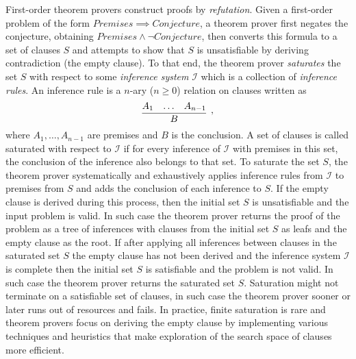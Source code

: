 First-order theorem provers construct proofs by \emph{refutation}. Given a first-order problem of the form $\mathit{Premises}\implies\mathit{Conjecture}$, a theorem prover first negates the conjecture, obtaining $\mathit{Premises}\wedge\neg\mathit{Conjecture}$, then converts this formula to a set of clauses $S$ and attempts to show that $S$ is unsatisfiable by deriving contradiction (the empty clause). To that end, the theorem prover \emph{saturates} the set $S$ with respect to some \emph{inference system} $\mathcal{I}$ which is a collection of \emph{inference rules}. An inference rule is a $n$-ary ($n\ge0$) relation on clauses written as \[\infer[,]{B}{A_1 & \ldots & A_{n-1}}\] where $A_1,\ldots,A_{n-1}$ are premises and $B$ is the conclusion. A set of clauses is called saturated with respect to $\mathcal{I}$ if for every inference of $\mathcal{I}$ with premises in this set, the conclusion of the inference also belongs to that set. To saturate the set $S$, the theorem prover systematically and exhaustively applies inference rules from $\mathcal{I}$ to premises from $S$ and adds the conclusion of each inference to $S$. If the empty clause is derived during this process, then the initial set $S$ is unsatisfiable and the input problem is valid. In such case the theorem prover returns the proof of the problem as a tree of inferences with clauses from the initial set $S$ as leafs and the empty clause as the root. If after applying all inferences between clauses in the saturated set $S$ the empty clause has not been derived and the inference system $\mathcal{I}$ is complete then the initial set $S$ is satisfiable and the problem is not valid. In such case the theorem prover returns the saturated set $S$. Saturation might not terminate on a satisfiable set of clauses, in such case the theorem prover sooner or later runs out of resources and fails. In practice, finite saturation is rare and theorem provers focus on deriving the empty clause by implementing various techniques and heuristics that make exploration of the search space of clauses more efficient.

